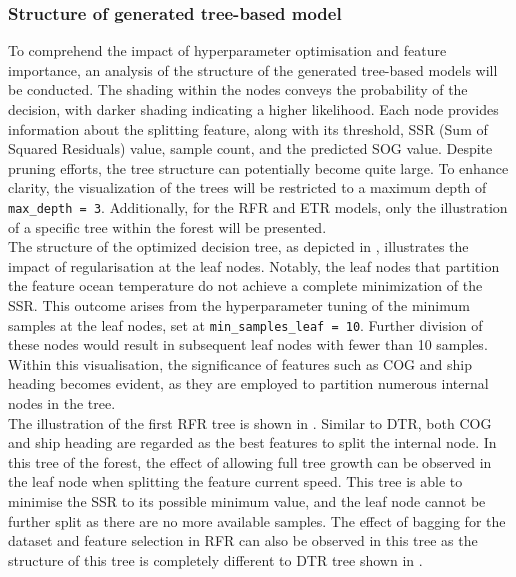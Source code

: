 \subsubsection*{Structure of generated tree-based model}


To comprehend the impact of hyperparameter optimisation and feature importance, an analysis of the structure of the generated tree-based models will be conducted. The shading within the nodes conveys the probability of the decision, with darker shading indicating a higher likelihood. Each node provides information about the splitting feature, along with its threshold, SSR (Sum of Squared Residuals) value, sample count, and the predicted SOG value. Despite pruning efforts, the tree structure can potentially become quite large. To enhance clarity, the visualization of the trees will be restricted to a maximum depth of {\tt max\_depth = 3}. Additionally, for the RFR and ETR models, only the illustration of a specific tree within the forest will be presented.\\

The structure of the optimized decision tree, as depicted in , illustrates the impact of regularisation at the leaf nodes. Notably, the leaf nodes that partition the feature ocean temperature do not achieve a complete minimization of the SSR. This outcome arises from the hyperparameter tuning of the minimum samples at the leaf nodes, set at {\tt min\_samples\_leaf = 10}. Further division of these nodes would result in subsequent leaf nodes with fewer than 10 samples. Within this visualisation, the significance of features such as COG and ship heading becomes evident, as they are employed to partition numerous internal nodes in the tree.\\


The illustration of the first RFR tree is shown in . Similar to DTR, both COG and ship heading are regarded as the best features to split the internal node. In this tree of the forest, the effect of allowing full tree growth can be observed in the leaf node when splitting the feature current speed. This tree is able to minimise the SSR to its possible minimum value, and the leaf node cannot be further split as there are no more available samples. The effect of bagging for the dataset and feature selection in RFR can also be observed in this tree as the structure of this tree is completely different to DTR tree shown in .\\

